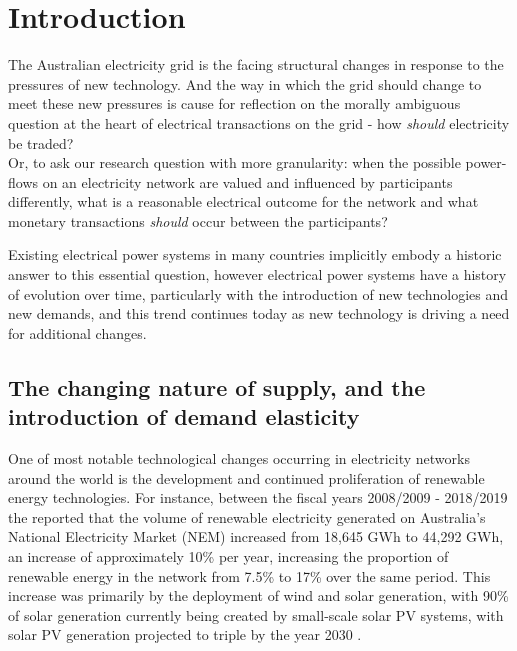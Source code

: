 \chapter{Introduction}
\label{cha:intro}

The Australian electricity grid is the facing structural changes in response to the pressures of new technology.
And the way in which the grid should change to meet these new pressures is cause for reflection on the morally ambiguous question at the heart of electrical transactions on the grid - how \textit{should} electricity be traded?\\

Or, to ask our research question with more granularity:
when the possible power-flows on an electricity network are valued and influenced by participants differently, 
what is a reasonable electrical outcome for the network and what monetary transactions \textit{should} occur between the participants?

Existing electrical power systems in many countries implicitly embody a historic answer to this essential question, however electrical power systems have a history of evolution over time, particularly with the introduction of new technologies and new demands, and this trend continues today as new technology is driving a need for additional changes.

\section{The changing nature of supply, and the introduction of demand elasticity}

One of most notable technological changes occurring in electricity networks around the world is the development and continued proliferation of renewable energy technologies.
For instance, between the fiscal years 2008/2009 - 2018/2019 the \cite{departmentoftheenvironmentenergy2018} reported that the volume of renewable electricity generated on Australia's National Electricity Market (NEM) increased from 18,645 GWh to 44,292 GWh, an increase of approximately 10\% per year, increasing the proportion of renewable energy in the network from 7.5\% to 17\% over the same period.
This increase was primarily by the deployment of wind and solar generation, with 90\% of solar generation currently being created by small-scale solar PV systems, with solar PV generation projected to triple by the year 2030 \citep{australianenergymarketoperatorlimited2018}.

